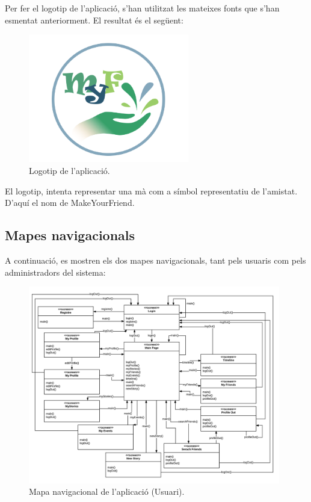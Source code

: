 \documentclass[11pt,catalan,listoffigures,listoftables]{tfgetsinf}
\begin{document}
Per fer el logotip de l'aplicació, s'han utilitzat les mateixes fonts que s'han esmentat anteriorment.
El resultat és el següent:

\begin{figure}[H]
\includegraphics[width=7cm]{images/image3}
\centering
\caption[]{Logotip de l'aplicació.}
\centering
\end{figure}

El logotip, intenta representar una mà com a símbol representatiu de l'amistat. D'aquí el nom de MakeYourFriend.

\subsection{Mapes navigacionals}

A continuació, es mostren els dos mapes navigacionals, tant pels usuaris com pels administradors del sistema:

\begin{figure}[H]
\includegraphics[width=11cm]{images/image9}
\centering
\caption[]{Mapa navigacional de l'aplicació (Usuari).}
\centering
\end{figure}
\end{document}
